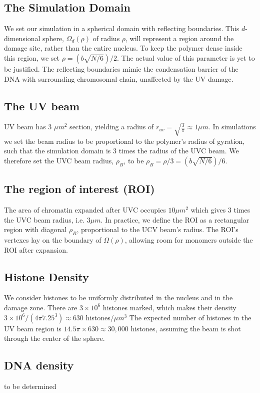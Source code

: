 \documentclass[12pt]{report}
\begin{document}
	\subsection{The Simulation Domain}
	We set our simulation in a spherical domain with reflecting boundaries. This $d$-dimensional sphere, $\Omega_d(\rho)$ of radius $\rho$, will represent a region around the damage site, rather than the entire nucleus. 
	To keep the polymer dense inside this region, we set $\rho=(b\sqrt{N/6})/2$. The actual value of this parameter is yet to be justified. The reflecting boundaries mimic the condensation barrier of the DNA with surrounding chromosomal chain, unaffected by the UV damage. 
		
	\subsection{The UV beam}
	UV beam has 3 $\mu m^2$ section, yielding a radius of $r_{uv}=\sqrt{\frac{3}{\pi}}\approx 1 \mu m$. 
	In simulations we set the beam radius to be proportional to the polymer's radius of gyration, such that the simulation domain is 3 times the radius of the UVC beam. We therefore set the UVC beam radius, $\rho_B$, to be  
    $\rho_B=\rho/3=(b\sqrt{N/6})/6$.
	
	\subsection{The region of interest (ROI)}
     The area of chromatin expanded after UVC occupies $10 \mu m^2$ which gives 3 times the UVC beam radius, i.e. $3\mu m$. In practice, we define the ROI as a rectangular region with diagonal $\rho_R$, proportional to the UCV beam's radius. The ROI's vertexes lay on the boundary of $\Omega(\rho)$, allowing room for monomers outside the ROI after expansion. 
		
    \subsection{Histone Density}
		We consider histones to be uniformly distributed in the nucleus and in the damage zone. There are $3\times 10^6$ histones marked, which makes their density $3\times 10^6 /(4 \pi 7.25^3)\approx 630$ histones/$\mu m^3$
		The expected number of histones in the UV beam region is $14.5\pi \times 630\approx 30,000$ histones, assuming the beam is shot through the center of the sphere. 
    
    \subsection{DNA density}
	to be determined	
	
\end{document}
